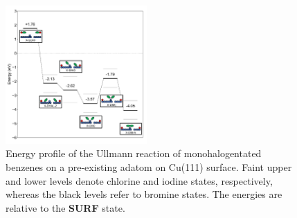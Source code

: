\documentclass[journal=jacsat,manuscript=article]{achemso}
\begin{document}
\begin{figure}[hbt]
\centering
\includegraphics[width=0.48\textwidth]{Fig/ullmann_adatom.pdf}
\caption{Energy profile of the Ullmann reaction of monohalogentated benzenes on a pre-existing adatom on Cu(111) surface. Faint upper and lower levels denote chlorine and iodine states, respectively, whereas the black levels refer to bromine states. The energies are relative to the \textbf{SURF} state. 
} 
\label{fig:adatomullmann}
\end{figure}

\ifdefined\INTERNAL
\end{document}
